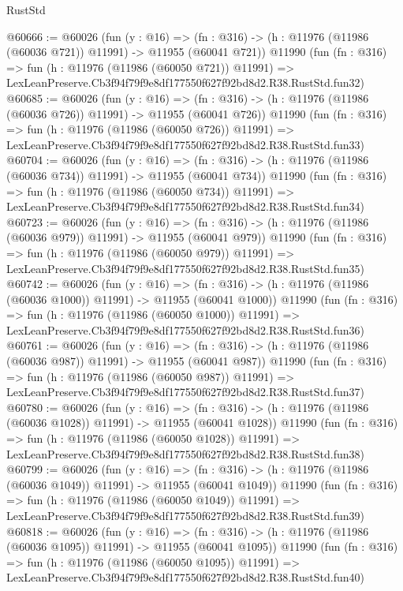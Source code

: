 \begin{lexlean}{RustStd}
\begin{coremodule}
@60666 := @60026
    (fun (y : @16) =>
    (fn : @316) -> (h : @11976 (@11986 (@60036 @721)) @11991) -> @11955 (@60041 @721))
    @11990
    (fun (fn : @316) =>
    fun (h : @11976 (@11986 (@60050 @721)) @11991) =>
    LexLeanPreserve.Cb3f94f79f9e8df177550f627f92bd8d2.R38.RustStd.fun32)
@60685 := @60026
    (fun (y : @16) =>
    (fn : @316) -> (h : @11976 (@11986 (@60036 @726)) @11991) -> @11955 (@60041 @726))
    @11990
    (fun (fn : @316) =>
    fun (h : @11976 (@11986 (@60050 @726)) @11991) =>
    LexLeanPreserve.Cb3f94f79f9e8df177550f627f92bd8d2.R38.RustStd.fun33)
@60704 := @60026
    (fun (y : @16) =>
    (fn : @316) -> (h : @11976 (@11986 (@60036 @734)) @11991) -> @11955 (@60041 @734))
    @11990
    (fun (fn : @316) =>
    fun (h : @11976 (@11986 (@60050 @734)) @11991) =>
    LexLeanPreserve.Cb3f94f79f9e8df177550f627f92bd8d2.R38.RustStd.fun34)
@60723 := @60026
    (fun (y : @16) =>
    (fn : @316) -> (h : @11976 (@11986 (@60036 @979)) @11991) -> @11955 (@60041 @979))
    @11990
    (fun (fn : @316) =>
    fun (h : @11976 (@11986 (@60050 @979)) @11991) =>
    LexLeanPreserve.Cb3f94f79f9e8df177550f627f92bd8d2.R38.RustStd.fun35)
@60742 := @60026
    (fun (y : @16) =>
    (fn : @316) -> (h : @11976 (@11986 (@60036 @1000)) @11991) -> @11955 (@60041 @1000))
    @11990
    (fun (fn : @316) =>
    fun (h : @11976 (@11986 (@60050 @1000)) @11991) =>
    LexLeanPreserve.Cb3f94f79f9e8df177550f627f92bd8d2.R38.RustStd.fun36)
@60761 := @60026
    (fun (y : @16) =>
    (fn : @316) -> (h : @11976 (@11986 (@60036 @987)) @11991) -> @11955 (@60041 @987))
    @11990
    (fun (fn : @316) =>
    fun (h : @11976 (@11986 (@60050 @987)) @11991) =>
    LexLeanPreserve.Cb3f94f79f9e8df177550f627f92bd8d2.R38.RustStd.fun37)
@60780 := @60026
    (fun (y : @16) =>
    (fn : @316) -> (h : @11976 (@11986 (@60036 @1028)) @11991) -> @11955 (@60041 @1028))
    @11990
    (fun (fn : @316) =>
    fun (h : @11976 (@11986 (@60050 @1028)) @11991) =>
    LexLeanPreserve.Cb3f94f79f9e8df177550f627f92bd8d2.R38.RustStd.fun38)
@60799 := @60026
    (fun (y : @16) =>
    (fn : @316) -> (h : @11976 (@11986 (@60036 @1049)) @11991) -> @11955 (@60041 @1049))
    @11990
    (fun (fn : @316) =>
    fun (h : @11976 (@11986 (@60050 @1049)) @11991) =>
    LexLeanPreserve.Cb3f94f79f9e8df177550f627f92bd8d2.R38.RustStd.fun39)
@60818 := @60026
    (fun (y : @16) =>
    (fn : @316) -> (h : @11976 (@11986 (@60036 @1095)) @11991) -> @11955 (@60041 @1095))
    @11990
    (fun (fn : @316) =>
    fun (h : @11976 (@11986 (@60050 @1095)) @11991) =>
    LexLeanPreserve.Cb3f94f79f9e8df177550f627f92bd8d2.R38.RustStd.fun40)

\end{coremodule}
\end{lexlean}
